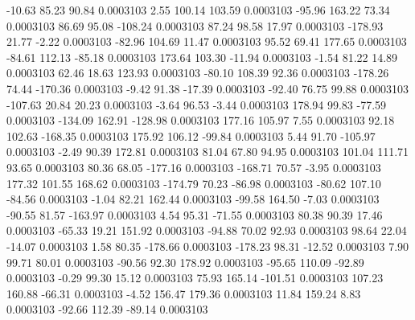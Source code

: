       -10.63       85.23       90.84     0.0003103
        2.55      100.14      103.59     0.0003103
      -95.96      163.22       73.34     0.0003103
       86.69       95.08     -108.24     0.0003103
       87.24       98.58       17.97     0.0003103
     -178.93       21.77       -2.22     0.0003103
      -82.96      104.69       11.47     0.0003103
       95.52       69.41      177.65     0.0003103
      -84.61      112.13      -85.18     0.0003103
      173.64      103.30      -11.94     0.0003103
       -1.54       81.22       14.89     0.0003103
       62.46       18.63      123.93     0.0003103
      -80.10      108.39       92.36     0.0003103
     -178.26       74.44     -170.36     0.0003103
       -9.42       91.38      -17.39     0.0003103
      -92.40       76.75       99.88     0.0003103
     -107.63       20.84       20.23     0.0003103
       -3.64       96.53       -3.44     0.0003103
      178.94       99.83      -77.59     0.0003103
     -134.09      162.91     -128.98     0.0003103
      177.16      105.97        7.55     0.0003103
       92.18      102.63     -168.35     0.0003103
      175.92      106.12      -99.84     0.0003103
        5.44       91.70     -105.97     0.0003103
       -2.49       90.39      172.81     0.0003103
       81.04       67.80       94.95     0.0003103
      101.04      111.71       93.65     0.0003103
       80.36       68.05     -177.16     0.0003103
     -168.71       70.57       -3.95     0.0003103
      177.32      101.55      168.62     0.0003103
     -174.79       70.23      -86.98     0.0003103
      -80.62      107.10      -84.56     0.0003103
       -1.04       82.21      162.44     0.0003103
      -99.58      164.50       -7.03     0.0003103
      -90.55       81.57     -163.97     0.0003103
        4.54       95.31      -71.55     0.0003103
       80.38       90.39       17.46     0.0003103
      -65.33       19.21      151.92     0.0003103
      -94.88       70.02       92.93     0.0003103
       98.64       22.04      -14.07     0.0003103
        1.58       80.35     -178.66     0.0003103
     -178.23       98.31      -12.52     0.0003103
        7.90       99.71       80.01     0.0003103
      -90.56       92.30      178.92     0.0003103
      -95.65      110.09      -92.89     0.0003103
       -0.29       99.30       15.12     0.0003103
       75.93      165.14     -101.51     0.0003103
      107.23      160.88      -66.31     0.0003103
       -4.52      156.47      179.36     0.0003103
       11.84      159.24        8.83     0.0003103
      -92.66      112.39      -89.14     0.0003103
